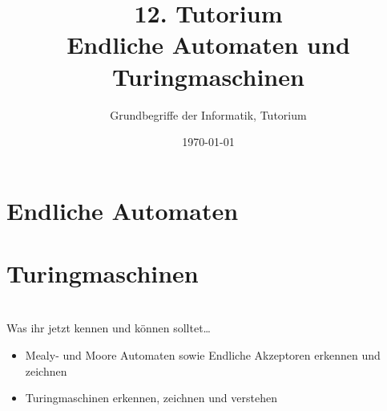




\usetikzlibrary{matrix}
\usetikzlibrary{arrows.meta}
\usetikzlibrary{automata}
\usetikzlibrary{tikzmark}

\title[Endliche Automaten und Turingmaschinen]{12. Tutorium\\  Endliche Automaten und Turingmaschinen}
\subtitle{Grundbegriffe der Informatik, Tutorium \hashtag\mytutnumber}
\date{\today}



\titleframe
\roadmap


\section{Endliche Automaten}


\section{Turingmaschinen}


\section{}
	\begin{frame}{Was ihr jetzt kennen und können solltet\dots}
			\begin{itemize}
				\item Mealy- und Moore Automaten sowie Endliche Akzeptoren erkennen und zeichnen
				\item Turingmaschinen erkennen, zeichnen und verstehen
			\end{itemize}
	
	\end{frame}
\section{}
\questionframe
\lastframe
{}
